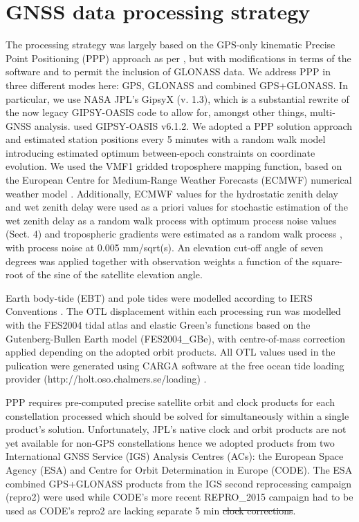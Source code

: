 \documentclass[se, manuscript]{copernicus}
\providecommand{\DIFadd}[1]{{\protect\color{blue}\uwave{#1}}} %
\providecommand{\DIFdel}[1]{{\protect\color{red}\sout{#1}}}                      %
\providecommand{\DIFaddbegin}{} %
\providecommand{\DIFaddend}{} %
\providecommand{\DIFdelbegin}{} %
\providecommand{\DIFdelend}{} %
\begin{document}
\section{GNSS data processing strategy}

The processing strategy was largely based on the GPS-only kinematic Precise Point Positioning (PPP) approach \citep{Zumberge1997} %
as per \cite{Penna2015}, but with modifications in terms of the software and to permit the inclusion of GLONASS data. We address PPP in three different modes here: GPS, GLONASS and combined GPS+GLONASS. In particular, we use NASA JPL’s GipsyX (v. 1.3), which is a substantial rewrite of the now legacy GIPSY-OASIS code to allow for, amongst other things, multi-GNSS analysis. \cite{Penna2015} used GIPSY-OASIS v6.1.2.
We adopted a PPP solution approach and estimated station positions every 5 minutes with a random walk model introducing estimated optimum between-epoch constraints on coordinate evolution. We used the VMF1 gridded troposphere mapping function, based on the European Centre for Medium-Range Weather Forecasts (ECMWF) numerical weather model \citep{Boehm2006}. Additionally, ECMWF values for the hydrostatic zenith delay and wet zenith delay were used as a priori values for stochastic estimation of the wet zenith delay as a random walk process with optimum process noise values (Sect. 4) and tropospheric gradients were estimated as a random walk process \citep{Bar-Sever1998}, with process noise at 0.005 mm/sqrt(s). An elevation cut-off angle of seven degrees was applied together with observation weights a function of the square-root of the sine of the satellite elevation angle.

Earth body-tide (EBT) and pole tides were modelled according to IERS Conventions \citep{IERS2010}. The OTL displacement within each processing run was modelled with the FES2004 tidal atlas \citep{Lyard2006} and elastic Green’s functions based on the Gutenberg-Bullen Earth model \citep{Farrell1972} (FES2004\_GBe), with centre-of-mass correction applied depending on the adopted orbit products. All OTL values used in the pulication were generated using CARGA software at the free ocean tide loading provider (http://holt.oso.chalmers.se/loading) \citep{bos_baker_2005}.

PPP requires pre-computed precise satellite orbit and clock products for each constellation processed which should be solved for simultaneously within a single product's solution. Unfortunately, JPL’s native clock and orbit products are not yet available for non-GPS constellations hence we adopted products from two International GNSS Service (IGS) \citep{Johnston2017} Analysis Centres (ACs): the European Space Agency (ESA) and Centre for Orbit Determination in Europe (CODE). The ESA combined GPS+GLONASS products from the IGS second reprocessing campaign (repro2) were used \citep{Griffiths2019} while CODE’s more recent REPRO\_2015 campaign \citep{repro2015} had to be used as CODE’s repro2 are lacking separate 5 min \DIFdelbegin \DIFdel{clock corrections}\DIFdelend \DIFaddbegin \DIFadd{GLONASS clocks}\DIFaddend .
\end{document}
